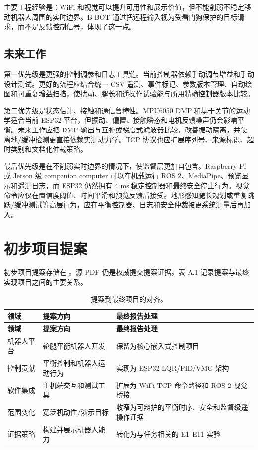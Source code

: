 \documentclass[12pt, a4paper]{article}
\begin{document}
主要工程经验是：WiFi 和视觉可以提升可用性和展示价值，但不能削弱不稳定移动机器人周围的实时边界。B-BOT 通过把远程输入视为受看门狗保护的目标请求，而不是反馈控制信号，体现了这一点。

\subsection{未来工作}

第一优先级是更强的控制调参和日志工具链。当前控制器依赖手动调节增益和手动设计测试。更好的流程应结合统一 CSV 遥测、事件标记、参数版本管理、自动绘图和可重复增益扫描，使扰动、腿长和遥操作试验能与所用精确控制器版本比较。

第二优先级是状态估计、接触和通信鲁棒性。MPU6050 DMP 和基于关节的运动学适合当前 ESP32 平台，但振动、偏置、接触瞬态和电机反馈噪声仍会影响平衡。未来工作应把 DMP 输出与互补或梯度式滤波器比较，改善振动隔离，并使离地/缓冲检测更直接依赖实测动力学。TCP 协议也应扩展序列号、来源标识、超时类别和文档化仲裁策略。

最后优先级是在不削弱实时边界的情况下，使监督层更加自包含。Raspberry Pi 或 Jetson 级 companion computer 可以在机载运行 ROS 2、MediaPipe、预览显示和遥测日志，而 ESP32 仍然拥有 4 ms 稳定控制器和最终安全停止行为。视觉命令应仅在置信度阈值、时间平滑和预览反馈后接受。地形感知腿长规划或重复跳跃/缓冲测试等高层行为，应在平衡控制器、日志和安全仲裁被更系统测量后再加入。


\newpage
\printbibliography

\newpage
\appendix
\section{初步项目提案}
初步项目提案存储在 。源 PDF 仍是权威提交提案证据。表 A.1 记录提案与最终实现项目之间的主要关系。

\begingroup
\singlespacing
\small
\setlength{\tabcolsep}{2pt}
\renewcommand{\arraystretch}{1.15}
\begin{longtable}{>{\RaggedRight\arraybackslash}p{}>{\RaggedRight\arraybackslash}p{}>{\RaggedRight\arraybackslash}p{}}
\caption{提案到最终项目的对齐。}\\
\toprule
\textbf{领域} & \textbf{提案方向} & \textbf{最终报告处理} \\
\midrule
\endfirsthead
\toprule
\textbf{领域} & \textbf{提案方向} & \textbf{最终报告处理} \\
\midrule
\endhead
机器人平台 & 轮腿平衡机器人开发 & 保留为核心嵌入式控制项目 \\
控制贡献 & 平衡控制和机器人运动行为 & 实现为 ESP32 LQR/PID/VMC 架构 \\
软件集成 & 主机端交互和测试工具 & 扩展为 WiFi TCP 命令路径和 ROS 2 视觉桥接 \\
范围变化 & 宽泛机动性/演示目标 & 收窄为可辩护的平衡时序、安全和监督级遥操作证据 \\
证据策略 & 构建并展示机器人能力 & 转化为与任务相关的 E1--E11 实验 \\
\bottomrule
\end{longtable}
\endgroup
\end{document}
